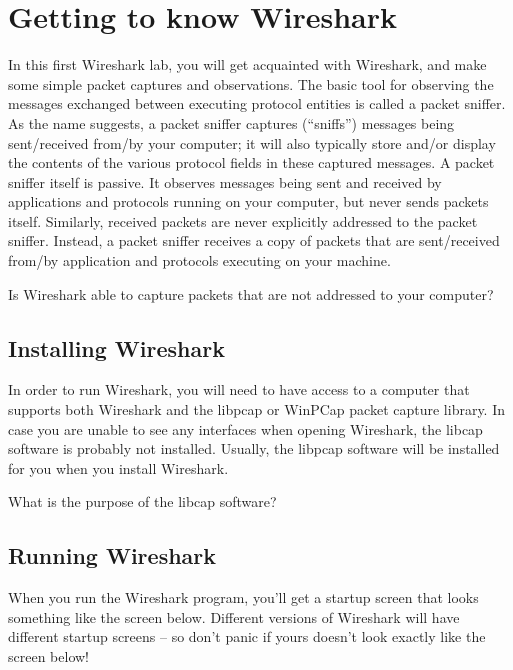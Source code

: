 \documentclass[11pt,a4paper]{article}
\begin{document}
\section{Getting to know Wireshark}
In this first Wireshark lab, you will get acquainted with Wireshark, and make some simple packet captures and observations.
The basic tool for observing the messages exchanged between executing protocol entities is called a packet sniffer. As the name suggests, a packet sniffer captures (``sniffs'') messages being sent/received from/by your computer; it will also typically store and/or display the contents of the various protocol fields in these captured messages. A packet sniffer itself is passive. It observes messages being sent and received by applications and protocols running on your computer, but never sends packets itself. Similarly, received packets are never explicitly addressed to the packet sniffer. Instead, a packet sniffer receives a copy of packets that are sent/received from/by application and protocols executing on your machine.

\begin{question}
    Is Wireshark able to capture packets that are not addressed to your computer?
\end{question}

\subsection{Installing Wireshark}
In order to run Wireshark, you will need to have access to a computer that supports both Wireshark and the libpcap or WinPCap packet capture library. 
In case you are unable to see any interfaces when opening Wireshark, the libcap software is probably not installed. Usually, the libpcap software will be installed for you when you install Wireshark.

\begin{question}
    What is the purpose of the libcap software?
\end{question}

\subsection{Running Wireshark}
When you run the Wireshark program, you'll get a startup screen that looks something
like the screen below. Different versions of Wireshark will have different startup screens
-- so don't panic if yours doesn't look exactly like the screen below!
\end{document}
